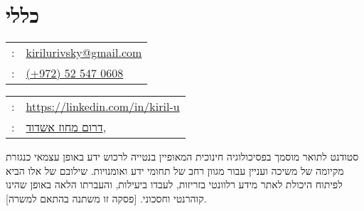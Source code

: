 \setRTL
\hspace{.25\textwidth}
\begin{minipage}[t]{.5\textwidth}
	\par{\par}
\end{minipage}
\section{כללי}
\unsetRTL
\setLTR
\begin{minipage}[t]{.5\linewidth}
	\begin{tabular}{rp{.75\linewidth}}
		\baselineskip=20pt
		\email{} : &\href{mailto:kirilurivsky@gmail.com}{kirilurivsky@gmail.com}\\
		\phone{} : &\href{tel:972525470608}{(+972) 52 547 0608}
	\end{tabular}
\end{minipage}
\begin{minipage}[t]{.5\linewidth}
	\begin{tabular}{rl}
		\linkedin{} : &\href{https://www.linkedin.com/in/kiril-u}{https://linkedin.com/in/kiril-u}\\
		\location{} : &\href{https://goo.gl/maps/MSacjpSy7vZSKykP7}{דרום מחוז אשדוד,}
	\end{tabular}
\end{minipage}	
\unsetLTR
\unsetRTL
\setRTL
\begin{minipage}[t]{1\linewidth}
	\vspace{0.25cm} %
	סטודנט לתואר מוסמך בפסיכולוגיה חינוכית המאופיין בנטייה לרכוש ידע באופן עצמאי כנגזרת מקיומה של משיכה ועניין עבור מגוון רחב של תחומי ידע ואומנויות.  שילובם של אלו הביא לפיתוח היכולת לאתר מידע רלוונטי בזריזות, לעבדו ביעילות, והעברתו הלאה באופן שהינו קוהרנטי וחסכוני. [פסקה זו משתנה בהתאם למשרה].
\end{minipage}

%

